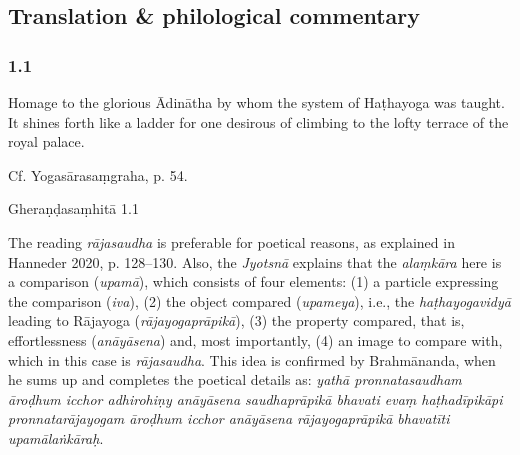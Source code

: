 


\pagestyle{HPed}
\begin{ekdosis}

\chapter*{Translation \& philological commentary}

\subsection*{1.1}
\begin{translation}[hp01_001]
Homage to the glorious Ādinātha by whom the system of Haṭhayoga was taught. It shines forth like a ladder for one desirous of climbing to the lofty terrace of the royal palace.
\end{translation}

\begin{testimonia}[hp01_001]
Cf. Yogasārasaṃgraha, p. 54.

\begin{versinnote}
\end{versinnote}

Gheraṇḍasaṃhitā 1.1

\begin{versinnote}
\end{versinnote}

\end{testimonia}

\begin{philcomm}[hp01_001]
The reading \emph{rājasaudha} is preferable for poetical reasons, as explained in Hanneder 2020, p. 128–130. Also, the \emph{Jyotsnā} explains that the \emph{alaṃkāra} here is a comparison (\emph{upamā}), which consists of four elements: (1) a particle expressing the comparison
(\emph{iva}), (2) the object compared (\emph{upameya}), i.e., the \emph{haṭhayogavidyā} leading to Rājayoga (\emph{rājayogaprāpikā}), (3) the property compared, that is, effortlessness (\emph{anāyāsena}) and, most importantly, (4) an image to compare with, which in this case is \emph{rājasaudha}. This idea is confirmed by Brahmānanda, when he sums up and completes the poetical details as: \emph{yathā pronnatasaudham āroḍhum icchor adhirohiṇy anāyāsena saudhaprāpikā bhavati evaṃ haṭhadīpikāpi pronnatarājayogam āroḍhum icchor anāyāsena rājayogaprāpikā bhavatīti upamālaṅkāraḥ}.


\end{philcomm}
\end{ekdosis}
